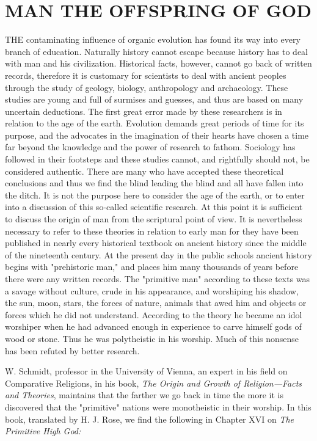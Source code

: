\chapter{MAN THE OFFSPRING OF GOD}

THE contaminating influence of organic evolution has found its way into every branch of
education. Naturally history cannot escape because history has to deal with man and his
civilization. Historical facts, however, cannot go back of written records, therefore it is
customary for scientists to deal with ancient peoples through the study of geology, biology,
anthropology and archaeology. These studies are young and full of surmises and guesses, and
thus are based on many uncertain deductions. The first great error made by these researchers
is in relation to the age of the earth. Evolution demands great periods of time for its purpose,
and the advocates in the imagination of their hearts have chosen a time far beyond the
knowledge and the power of research to fathom. Sociology has followed in their footsteps
and these studies cannot, and rightfully should not, be considered authentic. There are many
who have accepted these theoretical conclusions and thus we find the blind leading the blind
and all have fallen into the ditch. It is not the purpose here to consider the age of the earth, or
to enter into a discussion of this so-called scientific research. At this point it is sufficient to
discuss the origin of man from the scriptural point of view. It is nevertheless necessary to
refer to these theories in relation to early man for they have been published in nearly every
historical textbook on ancient history since the middle of the nineteenth century. At the
present day in the public schools ancient history begins with "prehistoric man," and places
him many thousands of years before there were any written records. The "primitive man"
according to these texts was a savage without culture, crude in his appearance, and
worshiping his shadow, the sun, moon, stars, the forces of nature, animals that awed him and
objects or forces which he did not understand. According to the theory he became an idol
worshiper when he had advanced enough in experience to carve himself gods of wood or
stone. Thus he was polytheistic in his worship. Much of this nonsense has been refuted by
better research.

W. Schmidt, professor in the University of Vienna, an expert in his field on Comparative
Religions, in his book, \textit{The Origin and Growth of Religion—Facts and Theories}, maintains
that the farther we go back in time the more it is discovered that the "primitive" nations were
monotheistic in their worship. In this book, translated by H. J. Rose, we find the following in
Chapter XVI on \textit{The Primitive High God:}

